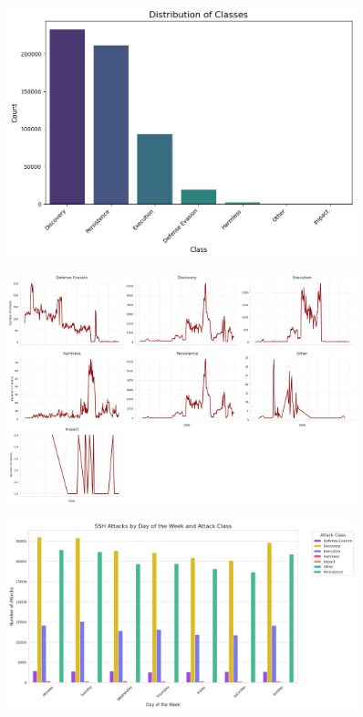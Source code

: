     \begin{figure}[H]
        \centering
        \includegraphics[width=0.9\textwidth]{../figures/plots/section1/distribution_of_classes.png}
        \caption{}
        \label{fig:}
    \end{figure}
    
    \begin{figure}[H]
        \centering
        \includegraphics[width=0.9\textwidth]{../figures/plots/section1/intents_over_timestamps.png}
        \caption{}
        \label{fig:}
    \end{figure}
    
    \begin{figure}[H]
        \centering
        \includegraphics[width=0.9\textwidth]{../figures/plots/section1/ssh_attacks_by_day_of_the_week_and_attack_class.png}
        \caption{}
        \label{fig:}
    \end{figure}
    
